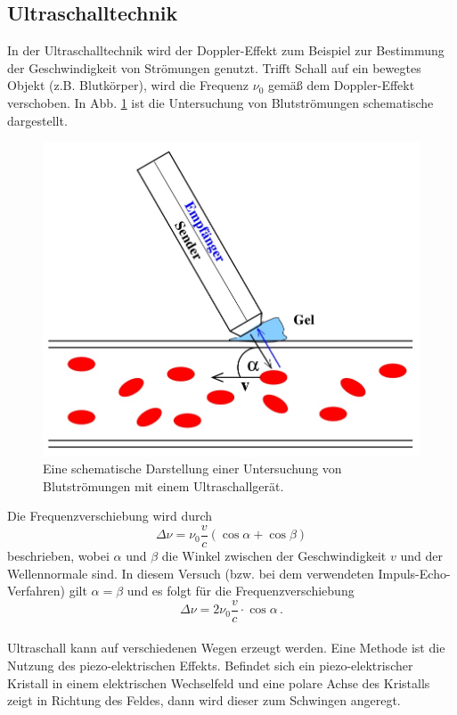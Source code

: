\subsection{Ultraschalltechnik}
In der Ultraschalltechnik wird der Doppler-Effekt zum Beispiel zur Bestimmung der Geschwindigkeit von Strömungen genutzt.
Trifft Schall auf ein bewegtes Objekt (z.B. Blutkörper), wird die Frequenz $\nu_0$ gemäß dem Doppler-Effekt verschoben.
In Abb. \ref{fig:ultraschall_schematisch} ist die Untersuchung von Blutströmungen schematische dargestellt.
\newpage
\begin{figure}
    \centering
    \includegraphics[width=0.75\linewidth]{content/data/ultraschall_schematisch.jpg}
    \caption{Eine schematische Darstellung einer Untersuchung von Blutströmungen mit einem Ultraschallgerät. \cite[1]{anleitung}}
    \label{fig:ultraschall_schematisch}
\end{figure}
Die Frequenzverschiebung wird durch
\begin{equation*}
    \Delta \nu = \nu_0 \frac{v}{c} \left ( \cos \alpha + \cos \beta \right )
\end{equation*}
beschrieben, wobei $\alpha$ und $\beta$ die Winkel zwischen der Geschwindigkeit $v$ und der Wellennormale sind.
In diesem Versuch (bzw. bei dem verwendeten Impuls-Echo-Verfahren) gilt $\alpha = \beta$ und es folgt für die Frequenzverschiebung
\begin{equation}
    \Delta \nu = 2 \nu_0 \frac{v}{c} \cdot \cos \alpha \, .
    \label{eqn:frequenzverschiebung}
\end{equation}
\\
Ultraschall kann auf verschiedenen Wegen erzeugt werden.
Eine Methode ist die Nutzung des piezo-elektrischen Effekts.
Befindet sich ein piezo-elektrischer Kristall in einem elektrischen Wechselfeld und eine polare Achse des Kristalls zeigt in Richtung des Feldes, dann wird dieser zum Schwingen angeregt.
